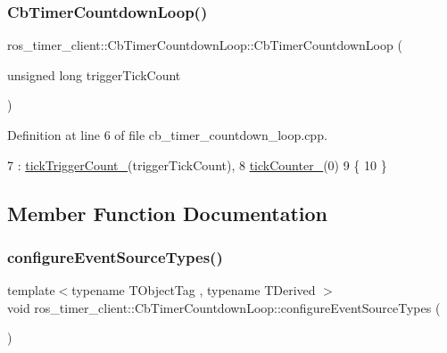 \subsubsection{\texorpdfstring{Cb\+Timer\+Countdown\+Loop()}{CbTimerCountdownLoop()}}
{\footnotesize\ttfamily ros\+\_\+timer\+\_\+client\+::\+Cb\+Timer\+Countdown\+Loop\+::\+Cb\+Timer\+Countdown\+Loop (\begin{DoxyParamCaption}\item[{unsigned long}]{trigger\+Tick\+Count }\end{DoxyParamCaption})}



Definition at line 6 of file cb\+\_\+timer\+\_\+countdown\+\_\+loop.\+cpp.


\begin{DoxyCode}
7     : \hyperlink{classros__timer__client_1_1CbTimerCountdownLoop_a864df8e309c3cbbb1fd225faf6d2cadf}{tickTriggerCount\_}(triggerTickCount),
8       \hyperlink{classros__timer__client_1_1CbTimerCountdownLoop_a7f9185e95af1d5be03be20b466122239}{tickCounter\_}(0)
9 \{
10 \}
\end{DoxyCode}


\subsection{Member Function Documentation}
\mbox{\label{classros__timer__client_1_1CbTimerCountdownLoop_a8e0193f4b75805b2b15fe6e63c631670}} 
\subsubsection{\texorpdfstring{configure\+Event\+Source\+Types()}{configureEventSourceTypes()}}
{\footnotesize\ttfamily template$<$typename T\+Object\+Tag , typename T\+Derived $>$ \\
void ros\+\_\+timer\+\_\+client\+::\+Cb\+Timer\+Countdown\+Loop\+::configure\+Event\+Source\+Types (\begin{DoxyParamCaption}{ }\end{DoxyParamCaption})\hspace{0.3cm}{\ttfamily [inline]}}



